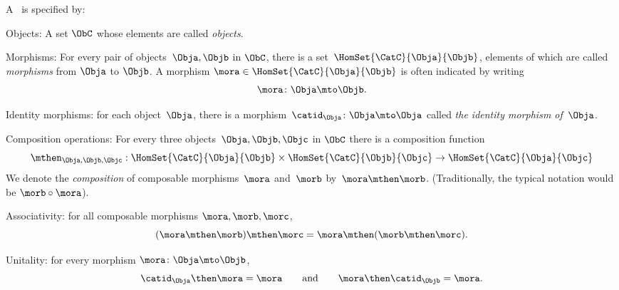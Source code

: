 {\begin{forslides}
        \begin{ctdefinition}
            \label{def:category-var}
            A \emph{}~\CatC is specified by:
            \begin{body}
                \constit
                \begin{compactenum}
                    \item Objects: A set $\ObC$ whose elements are called \emph{objects}.
                    \item Morphisms: For every pair of objects~$\Obja,\Objb$ in $\ObC$, there is a set~$\HomSet{\CatC}{\Obja}{\Objb}$, elements of which are called \emph{morphisms} from $\Obja$ to $\Objb$. A morphism $\mora \in \HomSet{\CatC}{\Obja}{\Objb}$ is often indicated by writing
                    \begin{equation*}
                        \mora \colon \Obja \mto \Objb.
                    \end{equation*}
                    \item Identity morphisms: for each object~$\Obja$, there is a morphism~$\catid_{\Obja}\colon \Obja \mto \Obja$  called \emph{the identity morphism of~$\Obja$}.
                    \item Composition operations: For every three objects~$\Obja,\Objb,\Objc$ in $\ObC$ there is a composition function
                    \begin{equation*}
                        \mthen_{\Obja,\Objb,\Objc}: \HomSet{\CatC}{\Obja}{\Objb} \times \HomSet{\CatC}{\Objb}{\Objc}\to \HomSet{\CatC}{\Obja}{\Objc}
                    \end{equation*}
                    We denote the \emph{composition} of composable morphisms~$\mora$ and~$\morb$ by~$\mora \mthen \morb$. (Traditionally, the typical notation would be $\morb \circ \mora$).

                \end{compactenum}
                \condit
                \begin{compactenum}
                    \item Associativity: for all composable morphisms $\mora, \morb, \morc$,
                    $$ (\mora\mthen \morb)
                    \mthen \morc= \mora \mthen (\morb \mthen \morc).$$
                    \item Unitality: for every morphism $\mora \colon \Obja \mto \Objb$,
                    $$ \catid_{\Obja} \then \mora = \mora \quad \quad \text{and} \quad \quad \mora \then \catid_{\Objb} = \mora. $$
                \end{compactenum}
            \end{body}
        \end{ctdefinition}


\end{forslides}}

